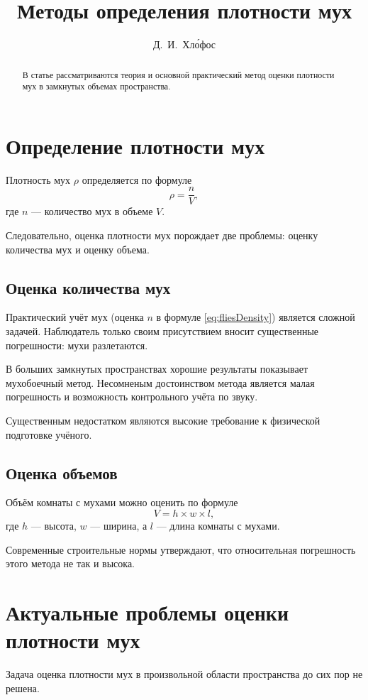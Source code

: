\documentclass{article} %
\title{Методы определения плотности мух} %
\author{Д.~И.~Хл\'{о}фос} %
\begin{document}
    \maketitle   %
    \begin{abstract}
        В статье рассматриваются теория и основной практический метод оценки плотности мух в замкнутых объемах пространства.
    \end{abstract}
    \tableofcontents %
    \newpage
    
    \section{Определение плотности мух}
    Плотность мух $\rho$ определяется по формуле
    \begin{equation}\label{eq:fliesDensity}
        \rho = \frac{n}{V},
    \end{equation}
    где $n$ --- количество мух в объеме $V$.

    Следовательно, оценка плотности мух порождает две проблемы: оценку количества мух и оценку объема.
    
    \subsection{Оценка количества мух}
    Практический учёт мух (оценка $n$ в формуле \ref{eq:fliesDensity}) является сложной задачей. Наблюдатель только своим присутствием вносит существенные погрешности: мухи разлетаются. 
    
    В больших замкнутых пространствах хорошие результаты показывает мухобоечный метод. Несомненым достоинством метода является малая погрешность и возможность контрольного учёта по звуку.
    
    Существенным недостатком являются высокие требование к физической подготовке учёного.
    
    \subsection{Оценка объемов}
    Объём комнаты с мухами можно оценить по формуле 
    \[V=h\times w\times l,\]
    где $h$ --- высота, $w$ --- ширина, а $l$ --- длина комнаты с мухами.
    
    Современные строительные нормы утверждают, что относительная погрешность этого метода не так и высока.
    
    \section{Актуальные проблемы оценки плотности мух}
    Задача оценка плотности мух в произвольной области пространства до сих пор не решена.
    
\end{document}
